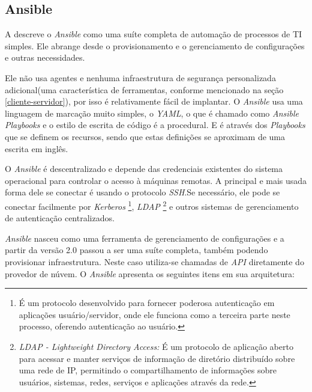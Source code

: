 \subsection{Ansible} \label{Ansible}

A  descreve o \textit{Ansible} como uma suíte completa de automação de processos de TI simples. Ele abrange desde o provisionamento e o gerenciamento de configurações e outras necessidades.

Ele não usa agentes e nenhuma infraestrutura de segurança personalizada adicional(uma característica de ferramentas, conforme mencionado na seção \ref{cliente-servidor}), por isso é relativamente fácil de implantar. O \textit{Ansible} usa uma linguagem de marcação muito simples, o \textit{YAML}, o que é chamado como \textit{Ansible Playbooks} e o estilo de escrita de código é a procedural. E é através dos \textit{Playbooks} que se definem os recursos, sendo que estas definições se aproximam de uma escrita em inglês. 

O \textit{Ansible} é descentralizado e depende das credenciais existentes do sistema operacional para controlar o acesso à máquinas remotas. A principal e mais usada forma dele se conectar é usando o protocolo \textit{SSH}.Se necessário, ele pode se conectar facilmente por \textit{Kerberos} \footnote{É um protocolo desenvolvido para fornecer poderosa autenticação em aplicações usuário/servidor, onde ele funciona como a terceira parte neste processo, oferendo autenticação ao usuário.}, \textit{LDAP} \footnote{\textit{LDAP - Lightweight Directory Access:} É um protocolo de aplicação aberto para acessar e manter serviços de informação de diretório distribuído sobre uma rede de IP, permitindo o compartilhamento de informações sobre usuários, sistemas, redes, serviços e aplicações através da rede.} e outros sistemas de gerenciamento de autenticação centralizados.


\textit{Ansible} nasceu como uma ferramenta de gerenciamento de configurações e a partir da versão 2.0 passou a ser uma suíte completa, também podendo provisionar infraestrutura. Neste caso utiliza-se chamadas de \textit{API} diretamente do provedor de núvem. O \textit{Ansible} apresenta os seguintes itens em sua arquitetura:

